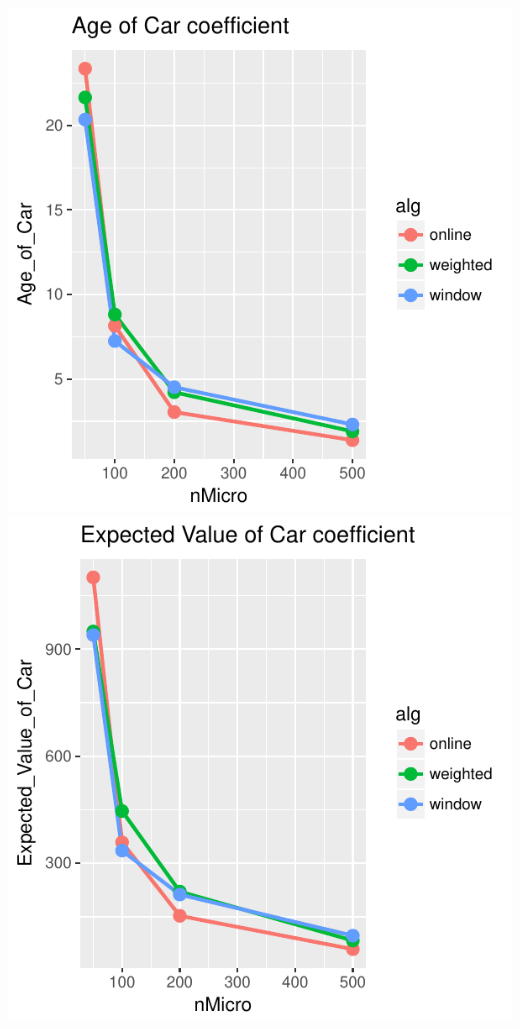 \includegraphics{offline_regression_files/figure-latex/unnamed-chunk-8-3.pdf}
\includegraphics{offline_regression_files/figure-latex/unnamed-chunk-8-4.pdf}
